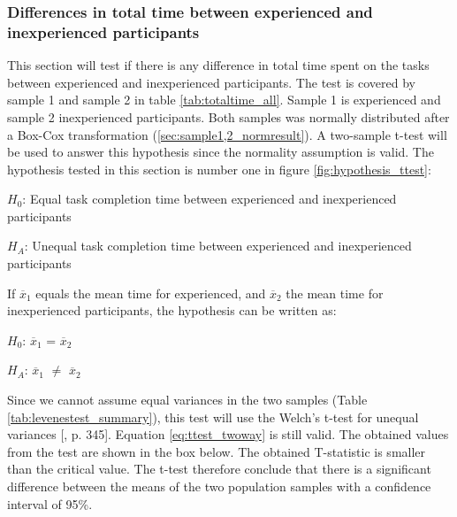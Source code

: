 \subsubsection[Sample 1, 2]{Differences in total time between experienced and inexperienced participants}\label{sec:t-test_result} 
This section will test if there is any difference in total time spent on the tasks between experienced and inexperienced participants. The test is covered by sample 1 and sample 2 in table \ref{tab:totaltime_all}. Sample 1 is experienced and sample 2 inexperienced participants. Both samples was normally distributed after a Box-Cox transformation (\ref{sec:sample1,2_normresult}). A two-sample t-test will be used to answer this hypothesis since the normality assumption is valid. The hypothesis tested in this section is number one in figure \ref{fig:hypothesis_ttest}: \\[0.3cm]

\centerline{$H_{0}$: Equal task completion time between experienced and inexperienced participants} 
\centerline{$H_{A}$: Unequal task completion time between experienced and inexperienced participants}
\vspace{0.3cm}

If $\overline{x}_1$ equals the mean time for experienced, and $\overline{x}_2$ the mean time for inexperienced participants, the hypothesis can be written as:\\[0.3cm]

\centerline{$H_{0}$: $\overline{x}_1$ = $\overline{x}_2$} 
\centerline{$H_{A}$: $\overline{x}_1$ $\neq$ $\overline{x}_2$}

\vspace{0.3cm}

Since we cannot assume equal variances in the two samples (Table \ref{tab:levenestest_summary}), this test will use the Welch's t-test for unequal variances [\citep{Walpole2012}, p. 345]. Equation \ref{eq:ttest_twoway} is still valid. The obtained values from the test are shown in the box below. The obtained T-statistic is smaller than the critical value. The t-test therefore conclude that there is a significant difference between the means of the two population samples with a confidence interval of 95\%.\\[0.2cm]

